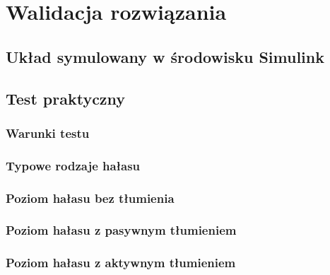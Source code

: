 \chapter{Walidacja rozwiązania}
\label{cha:tests}

\section{Układ symulowany w środowisku Simulink}

\section{Test praktyczny}

\subsection{Warunki testu}
\subsection{Typowe rodzaje hałasu}
\subsection{Poziom hałasu bez tłumienia}
\subsection{Poziom hałasu z pasywnym tłumieniem}
\subsection{Poziom hałasu z aktywnym tłumieniem}


